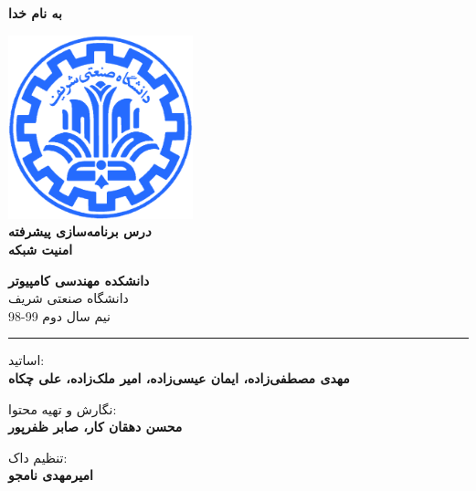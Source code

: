 \documentclass[]{article}
\begin{document}
\begin{titlepage}
\begin{center}

\textbf{ \Huge{به نام خدا} }
        
\vspace{0.2cm}

\includegraphics[width=0.4\textwidth]{sharif1.png}\\
\vspace{0.2cm}
\textbf{ \Huge{\emph درس برنامه‌سازی پیشرفته} }\\
\vspace{0.25cm}
\textbf{ \Large{امنیت شبکه} }
\vspace{0.2cm}
       
 
      \large \textbf{دانشکده مهندسی کامپیوتر}\\\vspace{0.1cm}
    \large   دانشگاه صنعتی شریف\\\vspace{0.2cm}
       \large   ﻧﯿﻢ سال دوم 99-98 \\\vspace{0.10cm}
      \noindent\rule[1ex]{\linewidth}{1pt}
اساتید:\\
    \textbf{{مهدی مصطفی‌زاده، ایمان عیسی‌زاده، امیر ملک‌زاده، علی چکاه}}



        \vspace{0.10cm}
نگارش و تهیه محتوا:\\
    \textbf{{محسن دهقان کار، صابر ظفرپور}}
    
       \vspace{0.10cm}
       تنظیم داک:\\
    \textbf{{امیرمهدی نامجو}}

    
        \vspace{0.05cm}
    

\end{center}
\end{titlepage}
\end{document}
